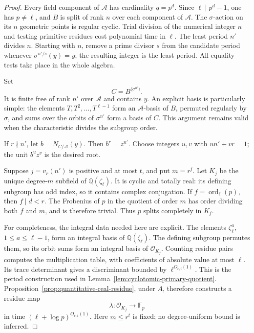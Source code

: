 \documentclass[11pt]{article}
\theoremstyle{definition}
\theoremstyle{remark}
\begin{document}
\begin{proof}
Every field component of \(\mathcal A\) has cardinality \(q=p^d\).
Since \(\ell\mid p^d-1\), one has \(p\ne\ell\), and \(B\) is split
of rank \(n\) over each component of \(\mathcal A\).
The \(\sigma\)-action on its \(n\) geometric points is regular cyclic.
Trial division of the numerical integer \(n\) and testing primitive
residues cost polynomial time in \(\ell\).
The least period \(n'\) divides \(n\).  Starting with \(n\), remove
a prime divisor \(s\) from the candidate period whenever
\(\sigma^{n'/s}(y)=y\); the resulting integer is the least period.
All equality tests take place in the whole algebra.

Set
\[
                  C=B^{\langle\sigma^{n'}\rangle}.
\]
It is finite free of rank \(n'\) over \(\mathcal A\) and contains \(y\).
An explicit basis is particularly simple: the elements
\(T,T^2,\ldots,T^{\ell-1}\) form an \(\mathcal A\)-basis of \(B\),
permuted regularly by \(\sigma\), and sums over the orbits of
\(\sigma^{n'}\) form a basis of \(C\).  This argument remains valid
when the characteristic divides the subgroup order.

If \(r\nmid n'\), let \(b=N_{C/\mathcal A}(y)\).
Then \(b^r=z^{n'}\).  Choose integers \(u,v\) with
\(un'+vr=1\); the unit \(b^u z^v\) is the desired root.

Suppose \(j=v_r(n')\) is positive and at most \(t\), and put \(m=r^j\).
Let \(K_j\) be the unique degree-\(m\) subfield of
\(\mathbb Q(\zeta_\ell)\).  It is cyclic and totally real:
its defining subgroup has odd index, so it contains complex conjugation.
If \(f=\operatorname{ord}_\ell(p)\), then \(f\mid d<r\).
The Frobenius of \(p\) in the quotient of order \(m\) has order
dividing both \(f\) and \(m\), and is therefore trivial.
Thus \(p\) splits completely in \(K_j\).

For completeness, the integral data needed here are explicit.
The elements \(\zeta_\ell^a\), \(1\leq a\leq\ell-1\), form an
integral basis of \(\mathbb Q(\zeta_\ell)\).
The defining subgroup permutes them, so its orbit sums form an
integral basis of \(\mathcal O_{K_j}\).
Counting residue pairs computes the multiplication table, with
coefficients of absolute value at most \(\ell\).
Its trace determinant gives a discriminant bounded by
\(\ell^{O_{r,t}(1)}\).
This is the period construction used in
Lemma~\ref{lem:cyclotomic-primary-quotient}.
Proposition~\ref{prop:quantitative-real-residue}, under \(A\),
therefore constructs a residue map
\[
                 \lambda:\mathcal O_{K_j}\longrightarrow\mathbb F_p
\]
in time \((\ell+\log p)^{O_{r,t}(1)}\).
Here \(m\leq r^t\) is fixed; no degree-uniform bound is inferred.


\end{proof}
\end{document}
